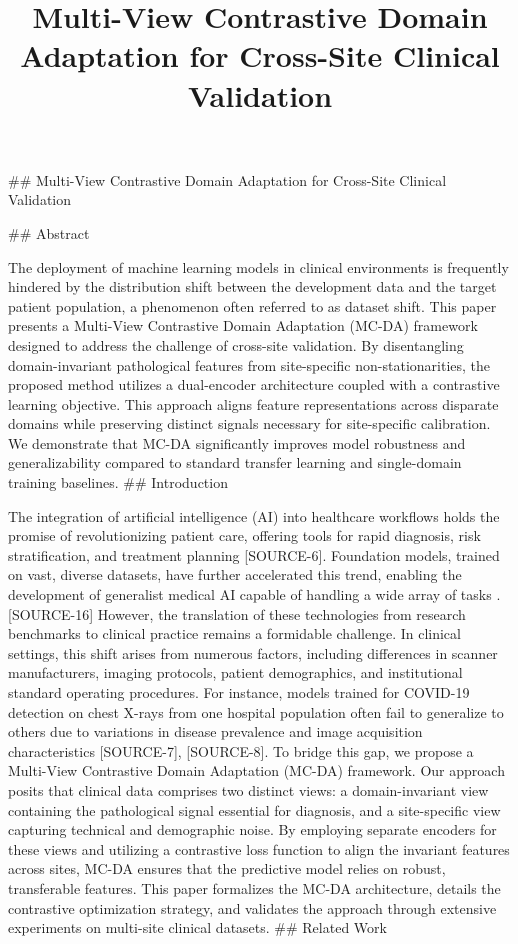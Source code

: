 \documentclass{article}
\title{Multi-View Contrastive Domain Adaptation for Cross-Site Clinical Validation}
\date{}
\begin{document}
\maketitle
\#\# Multi-View Contrastive Domain Adaptation for Cross-Site Clinical Validation

\#\# Abstract

The deployment of machine learning models in clinical environments is frequently hindered by the distribution shift between the development data and the target patient population, a phenomenon often referred to as dataset shift.  This paper presents a Multi-View Contrastive Domain Adaptation (MC-DA) framework designed to address the challenge of cross-site validation. By disentangling domain-invariant pathological features from site-specific non-stationarities, the proposed method utilizes a dual-encoder architecture coupled with a contrastive learning objective. This approach aligns feature representations across disparate domains while preserving distinct signals necessary for site-specific calibration. We demonstrate that MC-DA significantly improves model robustness and generalizability compared to standard transfer learning and single-domain training baselines. \#\# Introduction

The integration of artificial intelligence (AI) into healthcare workflows holds the promise of revolutionizing patient care, offering tools for rapid diagnosis, risk stratification, and treatment planning [SOURCE-6].  Foundation models, trained on vast, diverse datasets, have further accelerated this trend, enabling the development of generalist medical AI capable of handling a wide array of tasks . [SOURCE-16] However, the translation of these technologies from research benchmarks to clinical practice remains a formidable challenge.  In clinical settings, this shift arises from numerous factors, including differences in scanner manufacturers, imaging protocols, patient demographics, and institutional standard operating procedures. For instance, models trained for COVID-19 detection on chest X-rays from one hospital population often fail to generalize to others due to variations in disease prevalence and image acquisition characteristics [SOURCE-7], [SOURCE-8]. To bridge this gap, we propose a Multi-View Contrastive Domain Adaptation (MC-DA) framework. Our approach posits that clinical data comprises two distinct views: a domain-invariant view containing the pathological signal essential for diagnosis, and a site-specific view capturing technical and demographic noise. By employing separate encoders for these views and utilizing a contrastive loss function to align the invariant features across sites, MC-DA ensures that the predictive model relies on robust, transferable features. This paper formalizes the MC-DA architecture, details the contrastive optimization strategy, and validates the approach through extensive experiments on multi-site clinical datasets. \#\# Related Work
\end{document}
